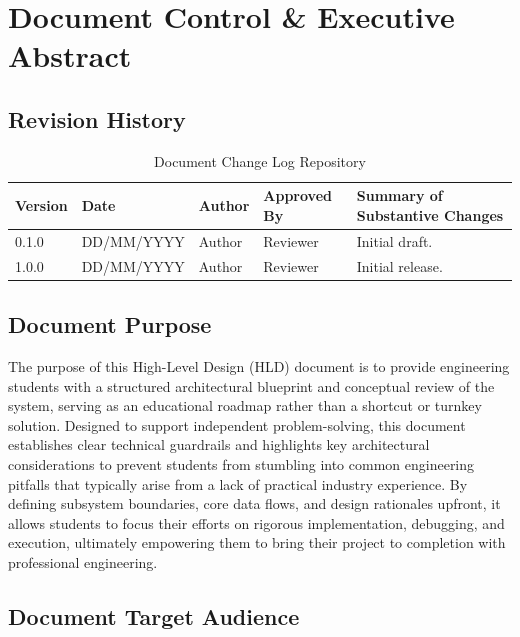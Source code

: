 
\section{Document Control \& Executive Abstract}

\subsection{Revision History}

\begin{table}[!htbp]
    \centering
    \small
    \begin{tabular}{llllp{6cm}}
        \toprule
        \textbf{Version} &
        \textbf{Date} &
        \textbf{Author} &
        \textbf{Approved By} &
        \textbf{Summary of Substantive Changes} \\
        \midrule
        0.1.0 & DD/MM/YYYY & Author & Reviewer & Initial draft. \\
        1.0.0 & DD/MM/YYYY & Author & Reviewer & Initial release. \\
        \bottomrule
    \end{tabular}
    \caption{Document Change Log Repository}
\end{table}

\subsection{Document Purpose}

The purpose of this High-Level Design (HLD) document is to provide engineering students with a structured architectural blueprint and conceptual review of the system, serving as an educational roadmap rather than a shortcut or turnkey solution. Designed to support independent problem-solving, this document establishes clear technical guardrails and highlights key architectural considerations to prevent students from stumbling into common engineering pitfalls that typically arise from a lack of practical industry experience. By defining subsystem boundaries, core data flows, and design rationales upfront, it allows students to focus their efforts on rigorous implementation, debugging, and execution, ultimately empowering them to bring their project to completion with professional engineering.

\subsection{Document Target Audience}

